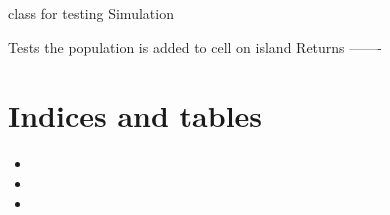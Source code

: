 \documentclass[a4paper,10pt,english]{sphinxmanual}
\begin{document}
\begin{fulllineitems}
\label{\detokenize{tests:biosim.tests.test_simulation.TestSimulation}}
class for testing Simulation

\begin{fulllineitems}
\label{\detokenize{tests:biosim.tests.test_simulation.TestSimulation.test_add_population}}
Tests the population is added to cell on island
Returns
-------

\end{fulllineitems}


\end{fulllineitems}



\chapter{Indices and tables}
\label{\detokenize{index:indices-and-tables}}\begin{itemize}
\item {} 

\item {} 

\item {} 

\end{itemize}
\end{document}
